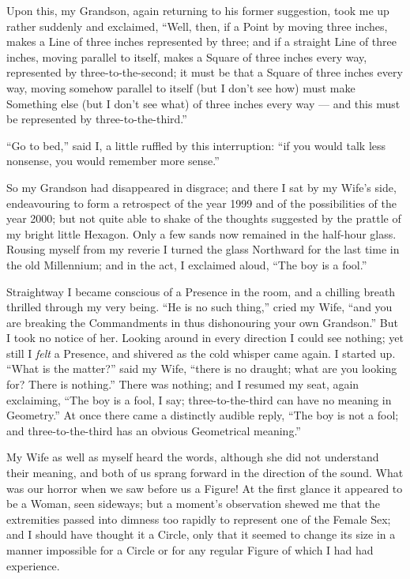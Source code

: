 \documentclass[10pt, kindle, oneside]{kindle}
\begin{document}
Upon this, my Grandson, again returning to his former suggestion, took me up
rather suddenly and exclaimed, ``Well, then, if a Point by moving three inches,
makes a Line of three inches represented by three; and if a straight Line of
three inches, moving parallel to itself, makes a Square of three inches every
way, represented by three-to-the-second; it must be that a Square of three
inches every way, moving somehow parallel to itself (but I don't see how) must
make Something else (but I don't see what) of three inches every way --- and
this must be represented by three-to-the-third.''

``Go to bed,'' said I, a little ruffled by this interruption: ``if you would talk
less nonsense, you would remember more sense.''

So my Grandson had disappeared in disgrace; and there I sat by my Wife's side,
endeavouring to form a retrospect of the year 1999 and of the possibilities of
the year 2000; but not quite able to shake of the thoughts suggested by the
prattle of my bright little Hexagon. Only a few sands now remained in the
half-hour glass. Rousing myself from my reverie I turned the glass Northward
for the last time in the old Millennium; and in the act, I exclaimed aloud,
``The boy is a fool.''

Straightway I became conscious of a Presence in the room, and a chilling
breath thrilled through my very being. ``He is no such thing,'' cried my Wife,
``and you are breaking the Commandments in thus dishonouring your own
Grandson.'' But I took no notice of her. Looking around in every direction I
could see nothing; yet still I \emph{felt} a Presence, and shivered as the cold
whisper came again. I started up. ``What is the matter?'' said my Wife, ``there
is no draught; what are you looking for? There is nothing.'' There was nothing;
and I resumed my seat, again exclaiming, ``The boy is a fool, I say;
three-to-the-third can have no meaning in Geometry.'' At once there came a
distinctly audible reply, ``The boy is not a fool; and three-to-the-third has
an obvious Geometrical meaning.''

My Wife as well as myself heard the words, although she did not understand
their meaning, and both of us sprang forward in the direction of the sound.
What was our horror when we saw before us a Figure! At the first glance it
appeared to be a Woman, seen sideways; but a moment's observation shewed me
that the extremities passed into dimness too rapidly to represent one of the
Female Sex; and I should have thought it a Circle, only that it seemed to
change its size in a manner impossible for a Circle or for any regular Figure
of which I had had experience.
\end{document}
